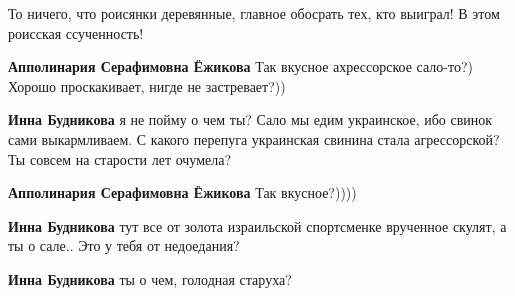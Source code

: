 \begin{itemize}
\begin{itemize}
То ничего, что роисянки деревянные, главное обосрать тех, кто выиграл! В этом роисская ссученность! \Smiley[1.0][yellow]

 
\textbf{Апполинария Серафимовна Ёжикова} Так вкусное ахрессорское сало-то?) Хорошо проскакивает, нигде не застревает?))

 
\textbf{Инна Будникова} я не пойму о чем ты? Сало мы едим украинское, ибо свинок сами выкармливаем. С какого перепуга украинская свинина стала агрессорской? Ты совсем на старости лет очумела? 🤣😂🤣

 
\textbf{Апполинария Серафимовна Ёжикова} Так вкусное?))))

 
\textbf{Инна Будникова} тут все от золота израильской спортсменке врученное скулят, а ты о сале.. Это у тебя от недоедания? \Smiley[1.0][yellow]

 
\textbf{Инна Будникова} ты о чем, голодная старуха? 🤣😂🤣

 

\end{itemize}
\end{itemize}
